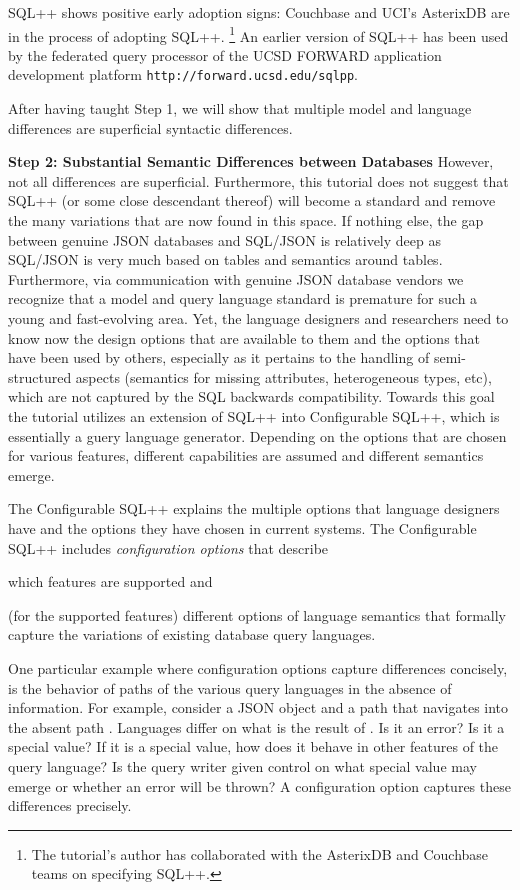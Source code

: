 SQL++ shows positive early adoption signs: Couchbase and UCI's AsterixDB are in the process of adopting SQL++.%
\footnote{The tutorial's author has collaborated with the AsterixDB and Couchbase teams on specifying SQL++.}
An earlier version of SQL++ has been used by the federated query processor of the UCSD FORWARD application development platform \texttt{http://forward.ucsd.edu/sqlpp}.

After having taught Step 1, we will show that multiple model and language differences are superficial syntactic differences.

\noindent \textbf{Step 2: Substantial Semantic Differences between Databases} However, not all differences are superficial. Furthermore, this tutorial does not suggest that SQL++ (or some close descendant thereof) will become a standard and remove the many variations that are now found in this space. If nothing else, the gap between genuine JSON databases and SQL/JSON is relatively deep as SQL/JSON is very much based on tables and semantics around tables. Furthermore, via communication with genuine JSON database vendors we recognize that a model and query language standard is premature for such a young and fast-evolving area. Yet, the language designers and researchers need to know now the design options that are available to them and the options that have been used by others, especially as it pertains to the handling of semi-structured aspects (semantics for missing attributes, heterogeneous types, etc), which are not captured by the SQL backwards compatibility. 
Towards this goal the tutorial utilizes an extension of SQL++ into Configurable SQL++, which is essentially a guery language generator. Depending on the options that are chosen for various features, different capabilities are assumed and different semantics emerge.

The Configurable SQL++ explains the multiple options that language designers have and the options they have chosen in current systems. The Configurable SQL++ includes {\em configuration options} that describe 
\begin{compact_enum}
\item which features are supported and 
\item (for the supported features) different options of language semantics that formally capture the variations of existing database query languages. 
\end{compact_enum}

One particular example where configuration options capture differences concisely, is the behavior of paths of the various query languages in the absence of information. For example, consider a JSON object  and a path that navigates into the absent path . Languages differ on what is the result of . Is it an error? Is it a special value? If it is a special value, how does it behave in other features of the query language? Is the query writer given control on what special value may emerge or whether an error will be thrown? A configuration option captures these differences precisely. 

